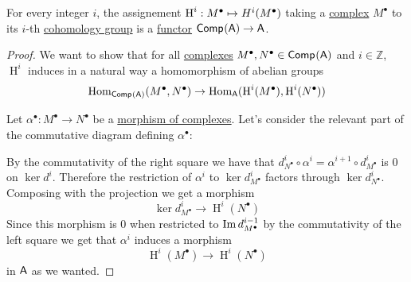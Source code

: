 \documentclass[../../../main]{subfiles}
\begin{document}
\begin{proposition}
  For every integer \(i\), the assignement \(\operatorname{H}^{i}: M^{\bullet} \mapsto H^{i}(M^{\bullet})\) taking a \hyperref[def:complex]{complex} \(M^{\bullet}\) to its \(i\)-th \hyperref[def:cohomology]{cohomology group} is a \hyperref[def:functor]{functor} \(\mathsf{Comp}^{}(\mathsf{A}) \to \mathsf{A}\).
\end{proposition}
\begin{proof}
  We want to show that for all \hyperref[def:complex]{complexes} \(M^{\bullet}, N^{\bullet} \in \mathsf{Comp}^{}(\mathsf{A})\) and \(i \in \mathbb{Z}\), \(\operatorname{H}^{i}\) induces in a natural way a homomorphism of abelian groups
  \begin{equation*}
    \operatorname{Hom}_{\mathsf{Comp}^{}(\mathsf{A})}(M^{\bullet}, N^{\bullet}) \to \operatorname{Hom}_{\mathsf{A}}(\operatorname{H}^{i}(M^{\bullet}), \operatorname{H}^{i}(N^{\bullet}))
  \end{equation*}

  Let \(\alpha^{\bullet}: M^{\bullet} \to N^{\bullet}\) be a \hyperref[def:complex-morphism]{morphism of complexes}. Let's consider the relevant part of the commutative diagram defining \(\alpha^{\bullet}\):
  \begin{center}
  \end{center}
  By the commutativity of the right square we have that \(d_{N^{\bullet}}^{i} \circ \alpha^{i} = \alpha^{i+1} \circ d_{M^{\bullet}}^{i}\) is 0 on \(\ker d^{i}\).
  Therefore the restriction of \(\alpha^{i}\) to \(\ker d_{M^{\bullet}}^{i}\) factors through \(\ker d_{N^{\bullet}}^{i}\).
  Composing with the projection we get a morphism
  \begin{equation*}
    \ker d_{M^{\bullet}}^{i} \to \operatorname{H}^{i}(N^{\bullet})
  \end{equation*}
  Since this morphism is 0 when restricted to \(\operatorname*{Im} d_{M^{\bullet}}^{i-1}\) by the commutativity of the left square we get that \(\alpha^{i}\) induces a morphism
  \begin{equation*}
    \operatorname{H}^{i}(M^{\bullet}) \to \operatorname{H}^{i}(N^{\bullet})
  \end{equation*}
  in \(\mathsf{A}\) as we wanted.
\end{proof}
\end{document}
